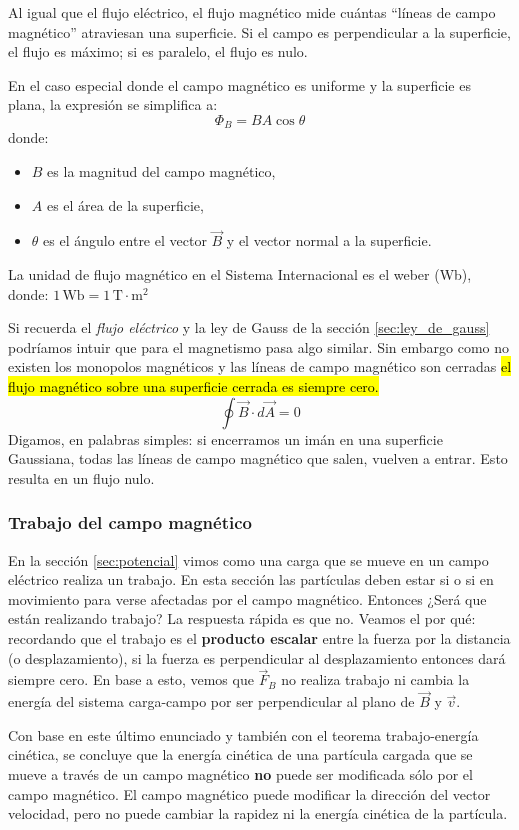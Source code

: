 Al igual que el flujo eléctrico, el flujo magnético mide cuántas ``líneas de campo magnético'' atraviesan una superficie. Si el campo es perpendicular a la superficie, el flujo es máximo; si es paralelo, el flujo es nulo.

En el caso especial donde el campo magnético es uniforme y la superficie es plana, la expresión se simplifica a:
\[
\Phi_B = B A \cos\theta
\]
donde:
\begin{itemize}
  \item \(B\) es la magnitud del campo magnético,
  \item \(A\) es el área de la superficie,
  \item \(\theta\) es el ángulo entre el vector \(\vec{B}\) y el vector normal a la superficie.
\end{itemize}

La unidad de flujo magnético en el Sistema Internacional es el weber (Wb), donde: \(1 \, \text{Wb} = 1 \, \text{T} \cdot \text{m}^2\)

Si recuerda el \textit{flujo eléctrico} y la ley de Gauss de la sección \ref{sec:ley_de_gauss} podríamos intuir que para el magnetismo pasa algo similar. Sin embargo como no existen los monopolos magnéticos y las líneas de campo magnético son cerradas \hl{el flujo magnético sobre una superficie cerrada es siempre cero.}
\[
\oint \vec{B}\cdot d\vec{A} = 0
\]
Digamos, en palabras simples: si encerramos un imán en una superficie Gaussiana, todas las líneas de campo magnético que salen, vuelven a entrar. Esto resulta en un flujo nulo.

\subsubsection{Trabajo del campo magnético}

En la sección \ref{sec:potencial} vimos como una carga que se mueve en un campo eléctrico realiza un trabajo. En esta sección las partículas deben estar si o si en movimiento para verse afectadas por el campo magnético. Entonces ¿Será que están realizando trabajo? La respuesta rápida es que no. Veamos el por qué: recordando que el trabajo es el \textbf{producto escalar} entre la fuerza por la distancia (o desplazamiento), si la fuerza es perpendicular al desplazamiento entonces dará siempre cero.
En base a esto, vemos que \(\vec{F}_B\) no realiza trabajo ni cambia la energía del sistema carga-campo por ser perpendicular al plano de \(\vec{B}\) y \(\vec{v}\). 

\begin{tcolorbox}[myconclusion]
  Con base en este último enunciado y también con el teorema trabajo-energía cinética, se concluye que la energía cinética de una partícula cargada que se mueve a través de un campo magnético \textbf{no} puede ser modificada sólo por el campo magnético. El campo magnético puede modificar la dirección del vector velocidad, pero no puede cambiar la rapidez ni la energía cinética de la partícula.
\end{tcolorbox}


